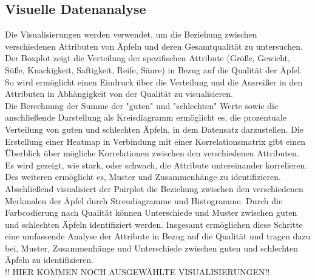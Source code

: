 \documentclass{article}
\begin{document}
\subsection{Visuelle Datenanalyse}
Die Visualisierungen werden verwendet, um die Beziehung zwischen verschiedenen Attributen von Äpfeln und deren Gesamtqualität zu untersuchen.\\ 
Der Boxplot zeigt die Verteilung der spezifischen Attribute (Größe, Gewicht, Süße, Knackigkeit, Saftigkeit, Reife, Säure) in Bezug auf die Qualität der Äpfel. So wird ermöglicht einen Eindruck über die Verteilung und die Ausreißer in den Attributen in Abhängigkeit von der Qualität zu visualisieren.\\
Die Berechnung der Summe der "guten" und "schlechten" Werte sowie die anschließende Darstellung als Kreisdiagramm ermöglicht es, die prozentuale Verteilung von guten und schlechten Äpfeln, in dem Datensatz darzustellen. Die Erstellung einer Heatmap in Verbindung mit einer Korrelationsmatrix gibt einen Überblick über mögliche Korrelationen zwischen den verschiedenen Attributen. Es wird gezeigt, wie stark, oder schwach, die Attribute untereinander korrelieren. Des weiteren ermöglicht es, Muster und Zusammenhänge zu identifizieren.\\ Abschließend visualisiert der Pairplot die Beziehung zwischen den verschiedenen Merkmalen der Äpfel durch Streudiagramme und Histogramme. Durch die Farbcodierung nach Qualität können Unterschiede und Muster zwischen guten und schlechten Äpfeln identifiziert werden. Insgesamt ermöglichen diese Schritte eine umfassende Analyse der Attribute in Bezug auf die Qualität und tragen dazu bei, Muster, Zusammenhänge und Unterschiede zwischen guten und schlechten Äpfeln zu identifizieren.\\
!! HIER KOMMEN NOCH AUSGEWÄHLTE VISUALISIERUNGEN!!
\end{document}
